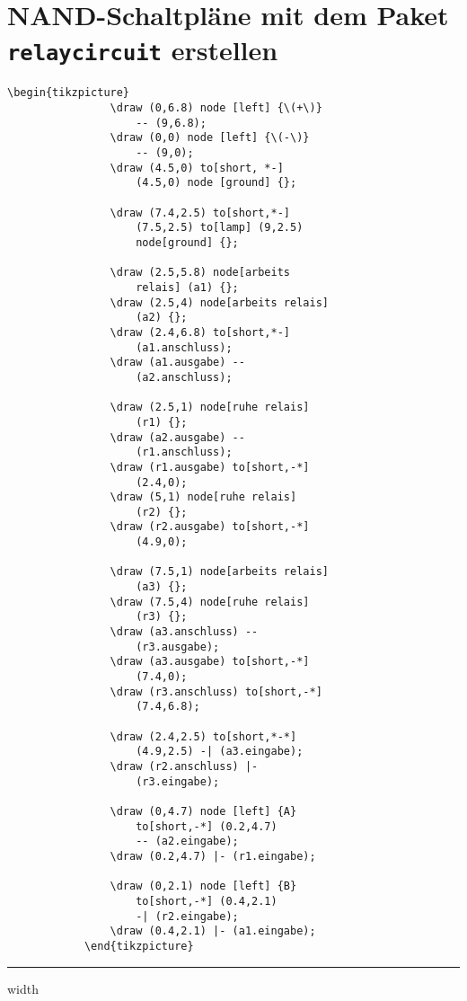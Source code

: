 \documentclass[a4paper]{scrartcl}
\begin{document}
 \section*{NAND-Schaltpläne mit dem Paket \texttt{relaycircuit} erstellen}
		\begin{lstlisting}[gobble=7,multicols=2,basicstyle=\footnotesize,caption={}]
			\begin{tikzpicture}
				\draw (0,6.8) node [left] {\(+\)} 
					-- (9,6.8);
				\draw (0,0) node [left] {\(-\)} 
					-- (9,0);
				\draw (4.5,0) to[short, *-] 
					(4.5,0) node [ground] {};
		
				\draw (7.4,2.5) to[short,*-] 
					(7.5,2.5) to[lamp] (9,2.5) 
					node[ground] {};

				\draw (2.5,5.8) node[arbeits 
					relais] (a1) {};
				\draw (2.5,4) node[arbeits relais] 
					(a2) {};
				\draw (2.4,6.8) to[short,*-] 
					(a1.anschluss);
				\draw (a1.ausgabe) -- 
					(a2.anschluss);

				\draw (2.5,1) node[ruhe relais] 
					(r1) {};
				\draw (a2.ausgabe) -- 
					(r1.anschluss);
				\draw (r1.ausgabe) to[short,-*] 
					(2.4,0);
				\draw (5,1) node[ruhe relais] 
					(r2) {};
				\draw (r2.ausgabe) to[short,-*] 
					(4.9,0);

				\draw (7.5,1) node[arbeits relais] 
					(a3) {};
				\draw (7.5,4) node[ruhe relais] 
					(r3) {};
				\draw (a3.anschluss) -- 
					(r3.ausgabe);
				\draw (a3.ausgabe) to[short,-*] 
					(7.4,0);
				\draw (r3.anschluss) to[short,-*] 
					(7.4,6.8);

				\draw (2.4,2.5) to[short,*-*] 
					(4.9,2.5) -| (a3.eingabe);
				\draw (r2.anschluss) |- 
					(r3.eingabe);

				\draw (0,4.7) node [left] {A} 
					to[short,-*] (0.2,4.7) 
					-- (a2.eingabe);
				\draw (0.2,4.7) |- (r1.eingabe);

				\draw (0,2.1) node [left] {B} 
					to[short,-*] (0.4,2.1)
					-| (r2.eingabe);
				\draw (0.4,2.1) |- (a1.eingabe);
			\end{tikzpicture}
		\end{lstlisting}
  \vspace{0.6cm}
  \hrule width \textwidth
  \vspace{1cm}
\end{document}
